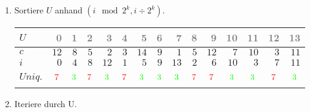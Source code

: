 \begin{enumerate}
\item 
Sortiere $U$ anhand $(i \mod 2^k, i \div 2^k)$.
\begin{center}
\small\begin{tabular}{lrrrrrrrrrrrrrr}
    \toprule 
    $U$ & \textcolor{gray}{0} & \textcolor{gray}{1} & \textcolor{gray}{2} & \textcolor{gray}{3} & \textcolor{gray}{4} & \textcolor{gray}{5} & \textcolor{gray}{6} & \textcolor{gray}{7} & \textcolor{gray}{8} & \textcolor{gray}{9} & \textcolor{gray}{10} & \textcolor{gray}{11} & \textcolor{gray}{12} & \textcolor{gray}{13}\\
    \midrule 
    $c$ & $12$ & $8$ & $5$ & $2$ & $3$ & $14$ & $9$ & $1$ & $5$ & $12$ & $7$ & $10$ & $3$ & $11$ \\
    $i$ & $0$ & $4$ & $8$ & $12$ & $1$ & $5$ & $9$ & $13$ & $2$ & $6$ & $10$ & $3$ & $7$ & $11$ \\
    $Uniq.$ & $$\xmarkc$$ & $$\cmarkc$$ & $$\xmarkc$$ & $$\cmarkc$$ & $$\xmarkc$$ & $$\cmarkc$$ & $$\cmarkc$$ & $$\cmarkc$$ & $$\xmarkc$$ & $$\xmarkc$$ & $$\cmarkc$$ & $$\cmarkc$$ & $$\xmarkc$$ & $$\cmarkc$$ \\
    \bottomrule 
\end{tabular}
\end{center}

\item 
Iteriere durch U.


\end{enumerate}
